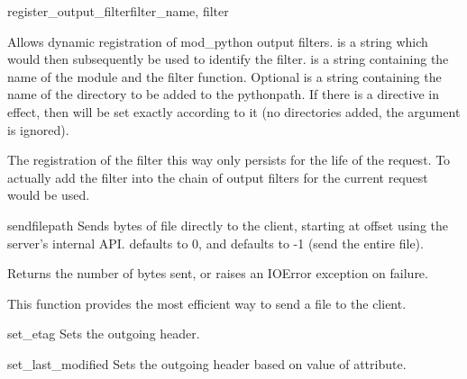 \begin{methoddesc}[request]{register_output_filter}{filter_name, filter}

  Allows dynamic registration of mod_python output filters. 
  is a string which would then subsequently be used to identify the filter.
   is a string containing the name of the module and the filter
  function. Optional  is a string containing the name of the directory
  to be added to the pythonpath. If there is a  directive in
  effect, then  will be set exactly according to it (no
  directories added, the  argument is ignored).

  The registration of the filter this way only persists for the life of the
  request. To actually add the filter into the chain of output filters for
  the current request  would be used.

\end{methoddesc}

\begin{methoddesc}[request]{sendfile}{path}
  Sends  bytes of file  directly to the client,
  starting at offset  using the server's internal
  API.  defaults to 0, and  defaults to -1 (send
  the entire file). 

  Returns the number of bytes sent, or raises an IOError exception
  on failure.

  This function provides the most efficient way to send a file to the
  client.
\end{methoddesc}

\begin{methoddesc}[request]{set_etag}{}
  Sets the outgoing  header.
\end{methoddesc}

\begin{methoddesc}[request]{set_last_modified}{}
  Sets the outgoing  header based on value of
   attribute.
\end{methoddesc}

